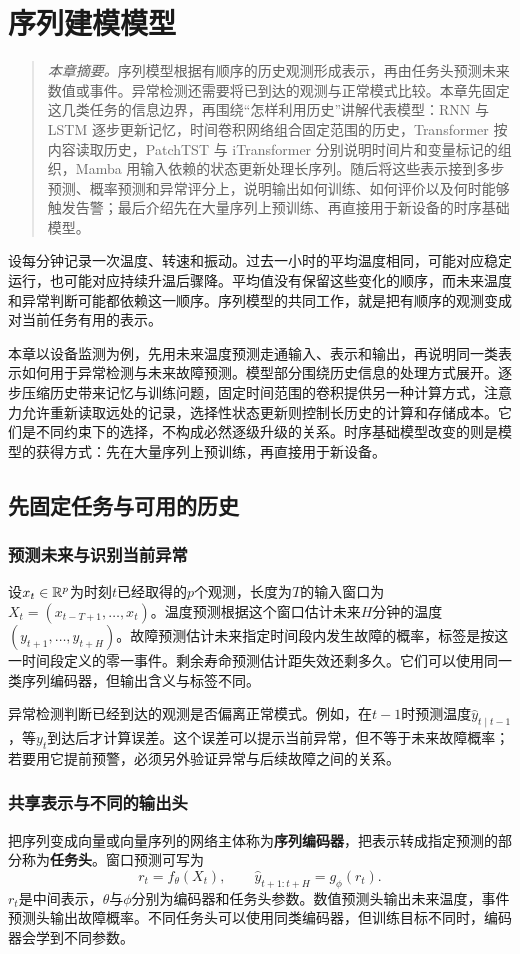 \chapter{序列建模模型}
\begin{quote}\small
\textit{本章摘要。}序列模型根据有顺序的历史观测形成表示，再由任务头预测未来数值或事件。异常检测还需要将已到达的观测与正常模式比较。本章先固定这几类任务的信息边界，再围绕“怎样利用历史”讲解代表模型：RNN 与 LSTM 逐步更新记忆，时间卷积网络组合固定范围的历史，Transformer 按内容读取历史，PatchTST 与 iTransformer 分别说明时间片和变量标记的组织，Mamba 用输入依赖的状态更新处理长序列。随后将这些表示接到多步预测、概率预测和异常评分上，说明输出如何训练、如何评价以及何时能够触发告警；最后介绍先在大量序列上预训练、再直接用于新设备的时序基础模型。
\end{quote}
设每分钟记录一次温度、转速和振动。过去一小时的平均温度相同，可能对应稳定运行，也可能对应持续升温后骤降。平均值没有保留这些变化的顺序，而未来温度和异常判断可能都依赖这一顺序。序列模型的共同工作，就是把有顺序的观测变成对当前任务有用的表示。

本章以设备监测为例，先用未来温度预测走通输入、表示和输出，再说明同一类表示如何用于异常检测与未来故障预测。模型部分围绕历史信息的处理方式展开。逐步压缩历史带来记忆与训练问题，固定时间范围的卷积提供另一种计算方式，注意力允许重新读取远处的记录，选择性状态更新则控制长历史的计算和存储成本。它们是不同约束下的选择，不构成必然逐级升级的关系。时序基础模型改变的则是模型的获得方式：先在大量序列上预训练，再直接用于新设备。

\section{先固定任务与可用的历史}
\subsection{预测未来与识别当前异常}
设$x_t\in\mathbb{R}^p$为时刻$t$已经取得的$p$个观测，长度为$T$的输入窗口为$X_t=(x_{t-T+1},\ldots,x_t)$。温度预测根据这个窗口估计未来$H$分钟的温度$(y_{t+1},\ldots,y_{t+H})$。故障预测估计未来指定时间段内发生故障的概率，标签是按这一时间段定义的零一事件。剩余寿命预测估计距失效还剩多久。它们可以使用同一类序列编码器，但输出含义与标签不同。

异常检测判断已经到达的观测是否偏离正常模式。例如，在$t-1$时预测温度$\hat y_{t\mid t-1}$，等$y_t$到达后才计算误差。这个误差可以提示当前异常，但不等于未来故障概率；若要用它提前预警，必须另外验证异常与后续故障之间的关系。

\subsection{共享表示与不同的输出头}
把序列变成向量或向量序列的网络主体称为\textbf{序列编码器}，把表示转成指定预测的部分称为\textbf{任务头}。窗口预测可写为
\begin{equation}
 r_t=f_\theta(X_t),\qquad \hat y_{t+1:t+H}=g_\phi(r_t).
 \label{eq:sequence-encoder-head}
\end{equation}
$r_t$是中间表示，$\theta$与$\phi$分别为编码器和任务头参数。数值预测头输出未来温度，事件预测头输出故障概率。不同任务头可以使用同类编码器，但训练目标不同时，编码器会学到不同参数。

